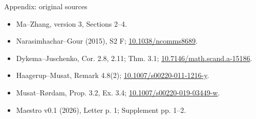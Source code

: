 \documentclass{beamer}
\begin{document}
\begin{frame}{Appendix: original sources}
\small
 \begin{itemize}
 \item Ma--Zhang, version 3, Sections 2--4.
 \item Narasimhachar--Gour (2015), S2 F; \href{https://doi.org/10.1038/ncomms8689}{10.1038/ncomms8689}.
 \item Dykema--Juschenko, Cor. 2.8, 2.11; Thm. 3.1; \href{https://doi.org/10.7146/math.scand.a-15186}{10.7146/math.scand.a-15186}.
 \item Haagerup--Musat, Remark 4.8(2); \href{https://doi.org/10.1007/s00220-011-1216-y}{10.1007/s00220-011-1216-y}.
 \item Musat--Rørdam, Prop. 3.2, Ex. 3.4; \href{https://doi.org/10.1007/s00220-019-03449-w}{10.1007/s00220-019-03449-w}.
 \item Maestro v0.1 (2026), Letter p. 1; Supplement pp. 1--2.
 \end{itemize}
\end{frame}
\FormalVerification
\end{document}
